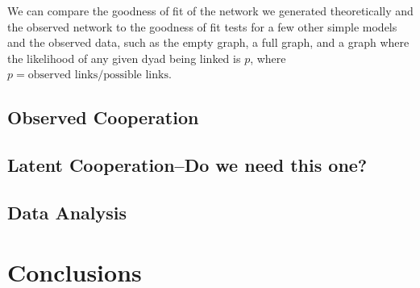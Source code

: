 \documentclass[12pt,onesided,fullpage]{amsart}
\begin{document}
We can compare the goodness of fit of the network we generated theoretically and the observed network to the goodness of fit tests for a few other simple models and the observed data, such as the empty graph, a full graph, and a graph where the likelihood of any given dyad being linked is $p$, where $p = \text{observed links}/\text{possible links}$.

\subsection{Observed Cooperation}
\subsection{Latent Cooperation--Do we need this one?}
\subsection{Data Analysis}

\section{Conclusions}
\end{document}
